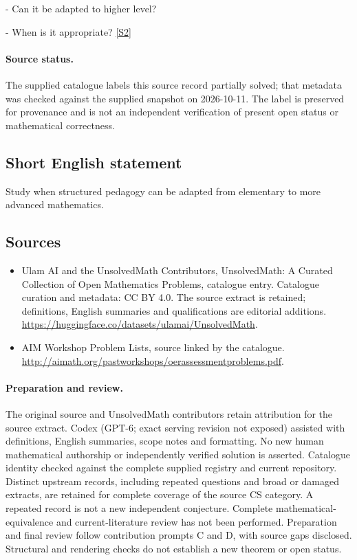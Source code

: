 \documentclass[11pt]{article}
\newcommand{\sref}[2]{\hyperlink{source:#1:#2}{[S#2]}}
\begin{document}
- Can it be adapted to higher level?

- When is it appropriate? \sref{statement}{2}
\paragraph{Source status.}
The supplied catalogue labels this source record partially solved; that metadata was checked against the supplied snapshot on 2026-10-11. The label is preserved for provenance and is not an independent verification of present open status or mathematical correctness.
\subsection{Short English statement}
Study when structured pedagogy can be adapted from elementary to more advanced mathematics.
\subsection{Sources}
\begin{itemize}
\item[\hypertarget{source:statement:1}{S1}] Ulam AI and the UnsolvedMath Contributors, UnsolvedMath: A Curated Collection of Open Mathematics Problems, catalogue entry. Catalogue curation and metadata: CC BY 4.0. The source extract is retained; definitions, English summaries and qualifications are editorial additions.
\url{https://huggingface.co/datasets/ulamai/UnsolvedMath}.
\item[\hypertarget{source:statement:2}{S2}] AIM Workshop Problem Lists, source linked by the catalogue.
\url{http://aimath.org/pastworkshops/oerassessmentproblems.pdf}.
\end{itemize}
\paragraph{Preparation and review.}
The original source and UnsolvedMath contributors retain attribution for the source extract. Codex (GPT-6; exact serving revision not exposed) assisted with definitions, English summaries, scope notes and formatting. No new human mathematical authorship or independently verified solution is asserted. Catalogue identity checked against the complete supplied registry and current repository. Distinct upstream records, including repeated questions and broad or damaged extracts, are retained for complete coverage of the source CS category. A repeated record is not a new independent conjecture. Complete mathematical-equivalence and current-literature review has not been performed. Preparation and final review follow contribution prompts C and D, with source gaps disclosed. Structural and rendering checks do not establish a new theorem or open status.
\label{end:statement}
\end{document}
